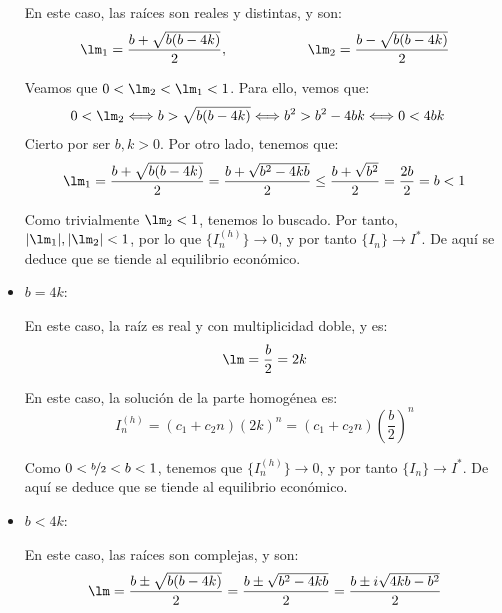 \begin{ejercicio}
\begin{itemize}
        En este caso, las raíces son reales y distintas, y son:
        \begin{equation*}
            \lm_1 = \frac{b+ \sqrt{b(b-4k)}}{2},\hspace{2cm} \lm_2 = \frac{b- \sqrt{b(b-4k)}}{2}
        \end{equation*}

        Veamos que $0<\lm_2<\lm_1<1$. Para ello, vemos que:
        \begin{align*}
            0< \lm_2 &\Longleftrightarrow
            b> \sqrt{b(b-4k)} \Longleftrightarrow
            b^2> b^2-4bk \Longleftrightarrow
            0<4bk
        \end{align*}
        Cierto por ser $b,k>0$. Por otro lado, tenemos que:
        \begin{align*}
            \lm_1 = \frac{b+ \sqrt{b(b-4k)}}{2}
            = \frac{b+ \sqrt{b^2-4kb}}{2}
            \leq \frac{b+ \sqrt{b^2}}{2} = \frac{2b}{2} = b < 1
        \end{align*}

        Como trivialmente $\lm_2<1$, tenemos lo buscado. Por tanto,
        $|\lm_1|,|\lm_2|<1$, por lo que $\{I_n^{(h)}\}\to 0$,
        y por tanto $\{I_n\}\to I^\ast$. De aquí se deduce que se tiende al
        equilibrio económico.

        \item \ul{$b=4k$}:
        
        En este caso, la raíz es real y con multiplicidad doble, y es:
        \begin{equation*}
            \lm = \frac{b}{2} = 2k
        \end{equation*}

        En este caso, la solución de la parte homogénea es:
        \begin{equation*}
            I_n^{(h)} = (c_1+c_2n)(2k)^n
            = (c_1+c_2n)\left(\frac{b}{2}\right)^n
        \end{equation*}

        Como $0<\nicefrac{b}{2}<b<1$, tenemos que $\{I_n^{(h)}\}\to 0$,
        y por tanto $\{I_n\}\to I^\ast$. De aquí se deduce que se tiende al
        equilibrio económico.

        \item \ul{$b<4k$}:
        
        En este caso, las raíces son complejas, y son:
        \begin{equation*}
            \lm = \frac{b\pm \sqrt{b(b-4k)}}{2}
            = \frac{b\pm \sqrt{b^2-4kb}}{2}
            = \frac{b\pm i\sqrt{4kb-b^2}}{2}
        \end{equation*}


\end{itemize}
\end{ejercicio}
